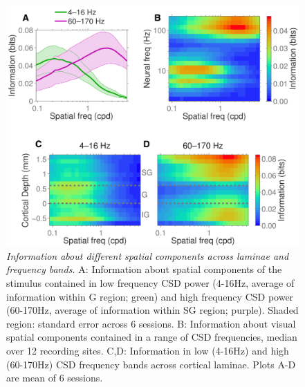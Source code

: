 \documentclass[english,a4paper]{article}
\begin{document}
\begin{figure}
\centering \includegraphics[width=\columnwidth]{fig5}
%
\caption{%
\textit{Information about different spatial components across laminae and frequency bands.}
A: Information about spatial components of the stimulus contained in 
low frequency CSD power (4-16Hz, average of information within G region; green) and high 
frequency CSD power (60-170Hz, average of information within SG region; purple). Shaded region: standard error across 6 sessions.
B: Information about visual spatial components contained in a range of CSD frequencies, median over 12 recording sites.
C,D: Information in low (4-16Hz) and high (60-170Hz) 
CSD frequency bands across cortical laminae.
Plots A-D are mean of 6 sessions.
}
%
\end{figure}
\end{document}
